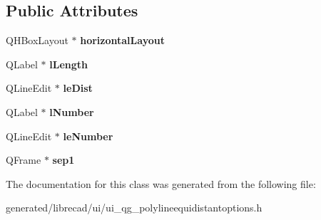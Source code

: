 \subsection*{Public Attributes}
\begin{DoxyCompactItemize}
\item 
\hypertarget{classUi__QG__PolylineEquidistantOptions_af41eb738ebe6e663c27a0156a1d596ec}{Q\-H\-Box\-Layout $\ast$ {\bfseries horizontal\-Layout}}\label{classUi__QG__PolylineEquidistantOptions_af41eb738ebe6e663c27a0156a1d596ec}

\item 
\hypertarget{classUi__QG__PolylineEquidistantOptions_a7ee41af9170e623e9f34545b448d360c}{Q\-Label $\ast$ {\bfseries l\-Length}}\label{classUi__QG__PolylineEquidistantOptions_a7ee41af9170e623e9f34545b448d360c}

\item 
\hypertarget{classUi__QG__PolylineEquidistantOptions_adbd246f82ccca05037f467ffe48bb3e0}{Q\-Line\-Edit $\ast$ {\bfseries le\-Dist}}\label{classUi__QG__PolylineEquidistantOptions_adbd246f82ccca05037f467ffe48bb3e0}

\item 
\hypertarget{classUi__QG__PolylineEquidistantOptions_ab90c2b04c6af41b65e211d9c5b14a31c}{Q\-Label $\ast$ {\bfseries l\-Number}}\label{classUi__QG__PolylineEquidistantOptions_ab90c2b04c6af41b65e211d9c5b14a31c}

\item 
\hypertarget{classUi__QG__PolylineEquidistantOptions_a94881988131a6a88336ec9ab239221ae}{Q\-Line\-Edit $\ast$ {\bfseries le\-Number}}\label{classUi__QG__PolylineEquidistantOptions_a94881988131a6a88336ec9ab239221ae}

\item 
\hypertarget{classUi__QG__PolylineEquidistantOptions_a6322e145b3c09b8285275b6e7e2402b5}{Q\-Frame $\ast$ {\bfseries sep1}}\label{classUi__QG__PolylineEquidistantOptions_a6322e145b3c09b8285275b6e7e2402b5}

\end{DoxyCompactItemize}


The documentation for this class was generated from the following file\-:\begin{DoxyCompactItemize}
\item 
generated/librecad/ui/ui\-\_\-qg\-\_\-polylineequidistantoptions.\-h\end{DoxyCompactItemize}
